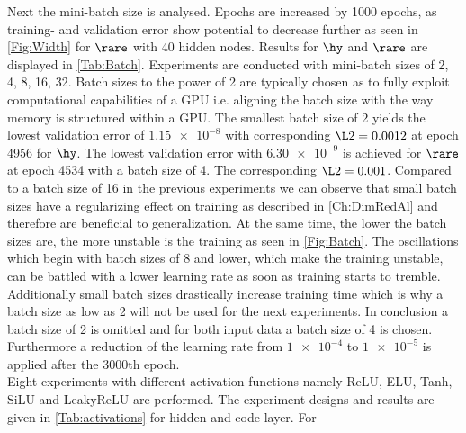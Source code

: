Next the mini-batch size is analysed. Epochs are increased by 1000 epochs, as training- and validation error show potential to decrease further as seen in \cref{Fig:Width} for \(\rare\) with 40 hidden nodes. Results for $\hy$  and  $\rare$ are displayed in \cref{Tab:Batch}. Experiments are conducted with mini-batch sizes of 2, 4, 8, 16, 32. Batch sizes to the power of 2 are typically chosen as to fully exploit computational capabilities of a GPU i.e. aligning the batch size with the way memory is structured within a GPU. The smallest batch size of 2 yields the lowest validation error of \(\num{1.15e-8}\) with corresponding \(\L2 = 0.0012\) at epoch 4956 for \(\hy\). The lowest validation error with \(\num{6.30e-9}\) is achieved for \(\rare\) at epoch 4534 with a batch size of 4. The corresponding \(\L2 = 0.001\). Compared to a batch size of 16 in the previous experiments we can observe that small batch sizes have a regularizing effect on training as described in \cref{Ch:DimRedAl} and therefore are beneficial to generalization. At the same time, the lower the batch sizes are, the more unstable is the training as seen in \cref{Fig:Batch}. The oscillations which begin with batch sizes of 8 and lower, which make the training unstable, can be battled with a lower learning rate as soon as training starts to tremble. Additionally small batch sizes drastically increase training time which is why a batch size as low as 2 will not be used for the next experiments. In conclusion a batch size of 2 is omitted and for both input data a batch size of 4 is chosen. Furthermore a reduction of the learning rate from \(\num{1e-4}\) to \(\num{1e-5}\) is applied after the 3000th epoch.\\
Eight experiments with different activation functions namely ReLU, ELU, Tanh, SiLU and LeakyReLU are performed. The experiment designs and results are given in \cref{Tab:activations} for hidden and code layer. For 
